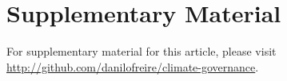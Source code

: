 \documentclass[a4paper,12pt]{article}
\begin{document}
\section*{Supplementary Material}
\label{sec:supplementary}

For supplementary material for this article, please visit \url{http://github.com/danilofreire/climate-governance}.

\nocite{freire2020replication}


\end{document}
